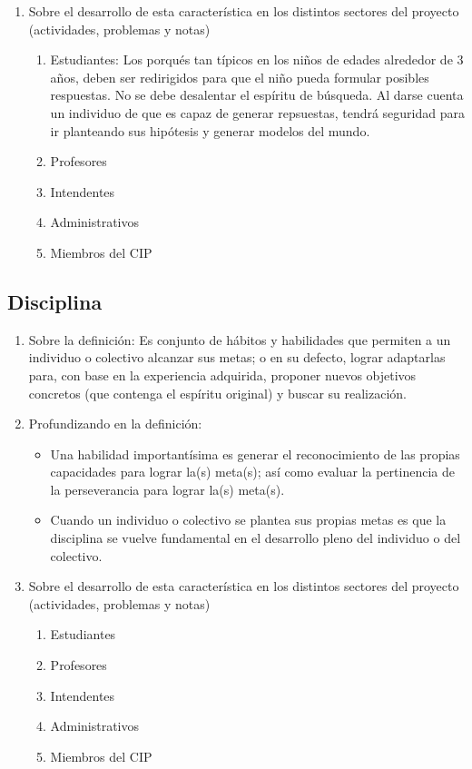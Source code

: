 \documentclass[10pt,letterpaper]{book}
\begin{document}
\begin{enumerate}[label*=\arabic*.]
		\item Sobre el desarrollo de esta característica en los distintos sectores del proyecto (actividades, problemas y notas)
			\begin{enumerate}[label*=\arabic*.]
			\item Estudiantes: Los porqués tan típicos en los niños de edades alrededor de 3 años, deben ser redirigidos para que el niño pueda formular posibles respuestas. No se debe desalentar el espíritu de búsqueda. Al darse cuenta un individuo de que es capaz de generar repsuestas, tendrá seguridad para ir planteando sus hipótesis y generar modelos del mundo.
			\item Profesores
			\item Intendentes
			\item Administrativos
			\item Miembros del CIP
			\end{enumerate}

		\end{enumerate}
		
	\subsection{Disciplina}
		
		\begin{enumerate}[label*=\arabic*.]
		\item Sobre la definición: Es conjunto de hábitos y habilidades que permiten a un individuo o colectivo alcanzar sus metas; o en su defecto, lograr adaptarlas para, con base en la experiencia adquirida, proponer nuevos objetivos concretos (que contenga el espíritu original) y buscar su realización.
		\item Profundizando en la definición: 
		\begin{itemize}
		\item Una habilidad importantísima es generar el reconocimiento de las propias capacidades para lograr la(s) meta(s); así como evaluar la pertinencia de la perseverancia para lograr la(s) meta(s).
		\item Cuando un individuo o colectivo se plantea sus propias metas es que la disciplina se vuelve fundamental en el desarrollo pleno del individuo o del colectivo.
		\end{itemize}


		\item Sobre el desarrollo de esta característica en los distintos sectores del proyecto (actividades, problemas y notas)
			\begin{enumerate}[label*=\arabic*.]
			\item Estudiantes
			\item Profesores
			\item Intendentes
			\item Administrativos
			\item Miembros del CIP
			\end{enumerate}

		\end{enumerate}
\end{document}
